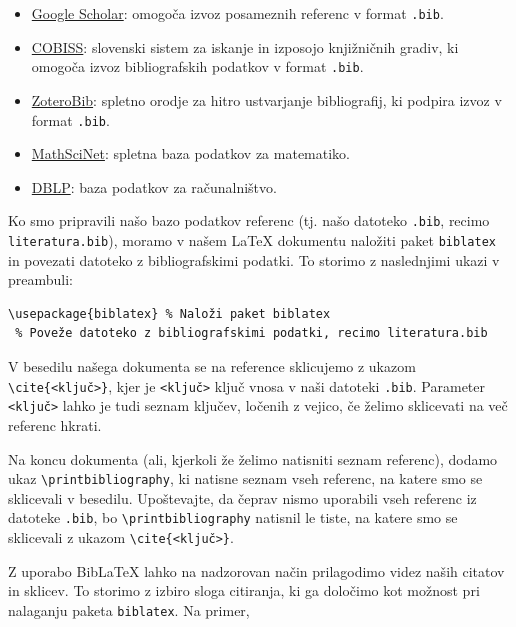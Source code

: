\begin{itemize}
\item \href{https://scholar.google.com/}{Google Scholar}: omogoča izvoz posameznih referenc v format \texttt{.bib}.
\item \href{https://www.cobiss.si/}{COBISS}: slovenski sistem za iskanje in izposojo knjižničnih gradiv, ki omogoča izvoz bibliografskih podatkov v format \texttt{.bib}.
\item \href{https://zbib.org/}{ZoteroBib}: spletno orodje za hitro ustvarjanje bibliografij, ki podpira izvoz v format \texttt{.bib}.
\item \href{https://mathscinet.ams.org/mathscinet}{MathSciNet}: spletna baza podatkov za matematiko.
\item \href{https://dblp.org/}{DBLP}: baza podatkov za računalništvo.
\end{itemize}

Ko smo pripravili našo bazo podatkov referenc (tj. našo datoteko \texttt{.bib}, recimo \texttt{literatura.bib}), moramo v našem LaTeX dokumentu naložiti paket \texttt{biblatex} in povezati datoteko z bibliografskimi podatki.
To storimo z naslednjimi ukazi v preambuli:

\begin{verbatim}
\usepackage{biblatex} % Naloži paket biblatex
 % Poveže datoteko z bibliografskimi podatki, recimo literatura.bib
\end{verbatim}

V besedilu našega dokumenta se na reference sklicujemo z ukazom \texttt{{\textbackslash}cite\{\textless ključ\textgreater \}}, kjer je \texttt{\textless ključ\textgreater } ključ vnosa v naši datoteki \texttt{.bib}.
Parameter \texttt{\textless ključ\textgreater } lahko je tudi seznam ključev, ločenih z vejico, če želimo sklicevati na več referenc hkrati.

Na koncu dokumenta (ali, kjerkoli  že želimo natisniti seznam referenc), dodamo ukaz \texttt{{\textbackslash}printbibliography}, ki natisne seznam vseh referenc, na katere smo se sklicevali v besedilu.
Upoštevajte, da čeprav nismo uporabili vseh referenc iz datoteke \texttt{.bib}, bo \texttt{{\textbackslash}printbibliography} natisnil le tiste, na katere smo se sklicevali z ukazom \texttt{{\textbackslash}cite\{\textless ključ\textgreater \}}.

Z uporabo BibLaTeX lahko na nadzorovan način prilagodimo videz naših citatov in sklicev. To storimo z izbiro sloga citiranja, ki ga določimo kot možnost pri nalaganju paketa \texttt{biblatex}.
Na primer,

